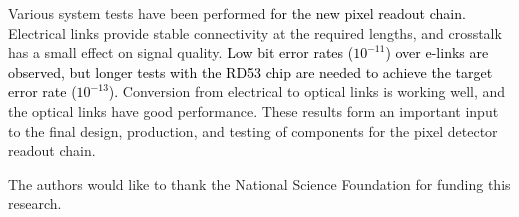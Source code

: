 \documentclass[a4paper,11pt]{article}
\newcommand{\gbps}{\ensuremath{\mathrm{Gb}/\mathrm{s}}\xspace}
\newcommand{\black}{\textcolor{black}}
\begin{document}
Various system tests have been performed \black{for the new pixel readout chain.}
Electrical links provide stable connectivity at the required lengths, and crosstalk has a small effect on signal quality.
\black{Low bit error rates ($10^{-11}$) over e-links are observed, but longer tests with the RD53 chip are needed to achieve the target error rate ($10^{-13}$).}
Conversion from electrical to optical links is working well, and the optical links have good performance.
These results form an important input to the final design, production, and testing of components for the pixel detector readout chain.

\acknowledgments

The authors would like to thank the National Science Foundation for funding this research.




\end{document}
